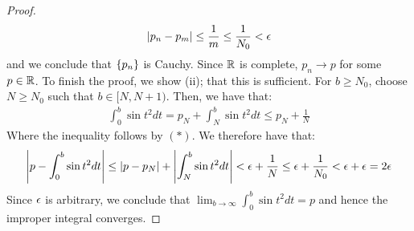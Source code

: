 \begin{proof}
    \begin{align*}
        \abs{p_n - p_m} \leq \frac{1}{m} \leq \frac{1}{N_0} < \epsilon
    \end{align*}
    and we conclude that $\set{p_n}$ is Cauchy. Since $\mathbb{R}$ is complete, $p_n \rightarrow p$ for some $p \in \mathbb{R}$. To finish the proof, we show (ii); that this is sufficient. For $b \geq N_0$, choose $N \geq N_0$ such that $b \in [N, N+1)$. Then, we have that:
    \begin{align*}
        \int_{0}^b \sin t^2 dt = p_N + \int_{N}^b \sin t^2 dt \leq p_N + \frac{1}{N}
    \end{align*}
    Where the inequality follows by $(*)$. We therefore have that:
    \begin{align*}
        \abs{p - \int_0^b \sin t^2 dt} \leq \abs{p - p_N} + \abs{\int_{N}^b \sin t^2 dt} < \epsilon + \frac{1}{N} \leq \epsilon + \frac{1}{N_0} < \epsilon + \epsilon  = 2\epsilon
    \end{align*}
    Since $\epsilon$ is arbitrary, we conclude that $\lim_{b \rightarrow \infty} \int_0^b \sin t^2 dt = p$ and hence the improper integral converges.
\end{proof}